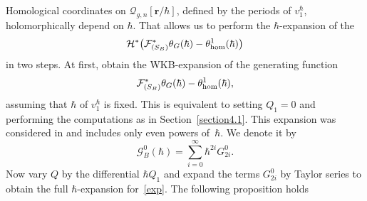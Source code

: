 \documentclass[pdftex]{sigma}
\numberwithin{equation}{section}
\theoremstyle{definition}
\begin{document}
Homological coordinates on $\mathcal{Q}_{g,n}[\mathbf{r}/\hbar]$, defined by the periods of $v^\hbar_{1}$, holomorphically depend on $\hbar.$ That allows us to perform the $\hbar$-expansion of the
\begin{equation}\label{exp}\mathcal{H}^*\big(\mathcal{F}_{(S_B)}^*\theta_{G}(\hbar)-\theta^{1}_{{\rm hom}}(\hbar)\big) \end{equation}
in two steps. At first, obtain the WKB-expansion of the generating function
\begin{equation*}
 \mathcal{F}_{(S_B)}^*\theta_{G}(\hbar)-\theta^{1}_{{\rm hom}}(\hbar),
\end{equation*}
assuming that $\hbar$ of $v^\hbar_{1}$ is fixed. This is equivalent to setting $Q_1=0$ and performing the computations as in Section~\ref{section4.1}. This expansion was considered in \cite{bertola2021wkb} and includes only even powers of~$\hbar$. We denote it by
\begin{equation*}\mathcal{G}^0_B(\hbar) =\sum^{\infty}_{i=0} \hbar^{2i} G^0_{2i}. \end{equation*}
Now vary $Q$ by the differential $\hbar Q_1$ and expand the terms $G^0_{2i}$ by Taylor series to obtain the full $\hbar$-expansion for~\eqref{exp}. The following proposition holds
\end{document}

